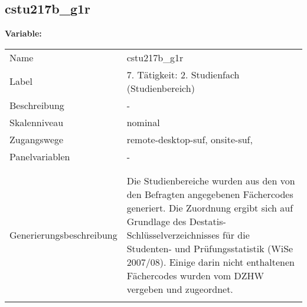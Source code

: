 	
	
	\subsection{cstu217b\_g1r}
	\label{subSection:cstu217b_g1r}

	\noindent\textbf{Variable:}\\
		\begin{tabular}{lL{11.3cm}}
			\label{tableVariable:cstu217b_g1r}
			Name & cstu217b\_g1r \\
			Label & 7. Tätigkeit: 2. Studienfach (Studienbereich) \\
			Beschreibung & - \\
			Skalenniveau & nominal \\
			Zugangswege &
				remote-desktop-suf,
				onsite-suf,
 \\
			Panelvariablen & -
			 \\
			 \\
 \\
					Generierungsbeschreibung & Die Studienbereiche wurden aus den von den Befragten angegebenen Fächercodes generiert. Die Zuordnung ergibt sich auf Grundlage des Destatis-Schlüsselverzeichnisses für die Studenten- und Prüfungsstatistik (WiSe 2007/08). Einige darin nicht enthaltenen Fächercodes wurden vom DZHW vergeben und zugeordnet. 
				 \\	
			 \\
		\end{tabular}






